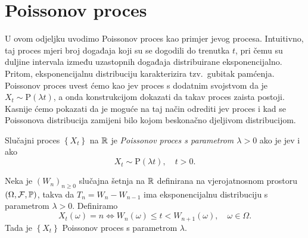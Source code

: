 \documentclass[main.tex]{subfiles}
\begin{document}
\section{Poissonov proces}\label{sec:sp-poisson}
U ovom odjeljku uvodimo Poissonov proces kao primjer \levy jevog procesa. Intuitivno, taj proces mjeri broj događaja koji su se dogodili do
trenutka \( t \), pri čemu su duljine intervala između uzastopnih događaja distribuirane eksponencijalno. Pritom, eksponencijalnu distribuciju karakterizira
tzv.\ gubitak pamćenja. Poissonov proces uvest ćemo kao \levy jev proces s dodatnim svojstvom da je \( X_t \sim \mathrm P(\lambda t) \), a onda konstrukcijom
dokazati da takav proces zaista postoji. Kasnije ćemo pokazati da je moguće na taj način odrediti \levy jev proces i kad se Poissonova distribucija zamijeni
bilo kojom beskonačno djeljivom distribucijom.

\begin{definicija} \label{def:poisson}
	Slučajni proces \( \left\{ X_t \right\} \) na \( \R \) je \emph{Poissonov proces s parametrom \( \lambda > 0\)} ako je \levy jev i ako
	\begin{equation} \label{eq:poispois}
		X_t \sim \mathrm{P}(\lambda t), \quad t > 0.
	\end{equation}
\end{definicija}

\begin{teorem}
	Neka je \( (W_n)_{n \ge 0} \) slučajna šetnja na \( \R \) definirana na vjerojatnosnom prostoru
	\( (\Omega, \mathcal F, \P) \), takva da \( T_n = W_n - W_{n-1} \) ima eksponencijalnu distribuciju
	s parametrom \( \lambda > 0 \). Definiramo
	\begin{equation}\label{eq:poiscons}
		X_t(\omega) = n \iff W_n(\omega) \le t < W_{n+1}(\omega), \quad \omega \in \Omega.
	\end{equation}
	Tada je \( \left\{ X_t \right\} \) Poissonov proces s parametrom \( \lambda \).
\end{teorem}
\end{document}
